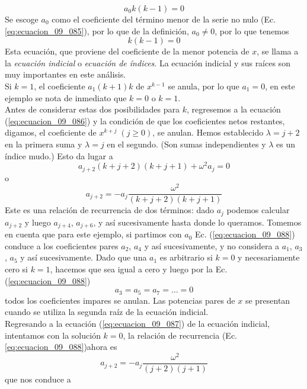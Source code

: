 \[ a_{0} k (k-1) = 0 \]
Se escoge $a_{0}$ como el coeficiente del término menor de la serie no nulo (Ec. \ref{eq:ecuacion_09_085}), por lo que de la definición, $a_{0} \neq 0$, por lo que tenemos
\begin{equation}
k (k -1) = 0
\label{eq:ecuacion_09_087}
\end{equation}
Esta ecuación, que proviene del coeficiente de la menor potencia de $x$, se llama a la \emph{ecuación indicial} o \emph{ecuación de índices}. La ecuación indicial y sus raíces son muy importantes en este análisis.
\\
Si $k=1$, el coeficiente $a_{1} (k+1)k$ de $x^{k-1}$ se anula, por lo que $a_{1} = 0$, en este ejemplo se nota de inmediato que $k=0$ o $k=1$.
\\
Antes de considerar estas dos posibilidades para $k$, regresemos a la ecuación (\ref{eq:ecuacion_09_086}) y la condición de que los coeficientes netos restantes, digamos, el coeficiente de $x^{k + j} \; (j \geq 0)$, se anulan. Hemos establecido $ \lambda = j + 2$ en la primera suma y $\lambda = j$ en el segundo. (Son sumas independientes y $\lambda$ es un índice mudo.) Esto da lugar a
\[ a_{j+2} (k + j + 2) (k + j + 1) + \omega^{2} a_{j} = 0 \]
o
\begin{equation}
a_{j+2} = - a_{j} \dfrac{\omega^{2}}{(k + j + 2)(k + j + 1)}
\label{eq:ecuacion_09_088}
\end{equation}
Este es una relación de recurrencia de dos términos: dado $a_{j}$ podemos calcular $a_{j+2}$ y luego $a_{j+4}$, $a_{j+6}$, y así sucesivamente hasta donde lo queramos. Tomemos en cuenta que para este ejemplo, si partimos con $a_{0}$ Ec. (\ref{eq:ecuacion_09_088}) conduce a los coeficientes pares $a_{2}$, $a_{4}$ y así sucesivamente, y no considera a $a_{1}$, $a_{3}$, $a_{5}$ y así sucesivamente. Dado que una $a_{1}$ es arbitrario si $k = 0$ y necesariamente cero si $k = 1$, hacemos que sea igual a cero  y luego por la Ec. (\ref{eq:ecuacion_09_088})
\[ a_{3} = a_{5} = a_{7} = \ldots = 0 \]
todos los coeficientes impares se anulan. Las potencias pares de $x$ se presentan cuando se utiliza la segunda raíz de la ecuación indicial.
\\
Regresando a la ecuación (\ref{eq:ecuacion_09_087}) de la ecuación indicial, intentamos con la solución $k=0$, la relación de recurrencia (Ec. \ref{eq:ecuacion_09_088})ahora es
\begin{equation}
a_{j+2} = - a_{j} \dfrac{\omega^{2}}{(j+2)(j+1)}
\label{eq:ecuacion_09_089}
\end{equation}
que nos conduce a

